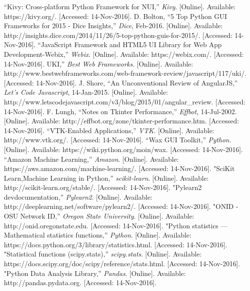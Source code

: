 \documentclass[journal,onecolumn]{IEEEtran}
\begin{document}
\begin{thebibliography}{1}

  “Kivy: Cross-platform Python Framework for NUI,” \emph{Kivy}. [Online]. Available: https://kivy.org/. [Accessed: 14-Nov-2016].
 D. Bolton, “5 Top Python GUI Frameworks for 2015 - Dice Insights,” \emph{Dice}, Feb-2016. [Online]. Available: http://insights.dice.com/2014/11/26/5-top-python-guis-for-2015/. [Accessed: 14-Nov-2016]. 
“JavaScript Framework and HTML5 UI Library for Web App Development-Webix,” \emph{Webix}. [Online]. Available: https://webix.com/. [Accessed: 14-Nov-2016]. 
 UKI,” \emph{Best Web Frameworks}. [Online]. Available: http://www.bestwebframeworks.com/web-framework-review/javascript/117/uki/. [Accessed: 14-Nov-2016]. 
J. Shore, “An Unconventional Review of AngularJS,” \emph{Let's Code Javascript}, 14-Jan-2015. [Online]. Available: http://www.letscodejavascript.com/v3/blog/2015/01/angular\_review. [Accessed: 14-Nov-2016]. 
 F. Lungh, “Notes on Tkinter Performance,” \emph{Effbot}, 14-Jul-2002. [Online]. Available: http://effbot.org/zone/tkinter-performance.htm. [Accessed: 14-Nov-2016]. 
 “VTK-Enabled Applications,” \emph{VTK}. [Online]. Available: http://www.vtk.org/. [Accessed: 14-Nov-2016]. 
 “Wax GUI Toolkit,” \emph{Python}. [Online]. Available: https://wiki.python.org/moin/wax. [Accessed: 14-Nov-2016]. 
 “Amazon Machine Learning,” \emph{Amazon}. [Online]. Available: https://aws.amazon.com/machine-learning/. [Accessed: 14-Nov-2016]. 
 "SciKit Learn,Machine Learning in Python,” \emph{scikit-learn}. [Online]. Available: http://scikit-learn.org/stable/. [Accessed: 14-Nov-2016]. 
 "Pylearn2 devdocumentation,” \emph{Pylearn2}. [Online]. Available: http://deeplearning.net/software/pylearn2/. [Accessed: 14-Nov-2016]. 
 "ONID - OSU Network ID,” \emph{Oregon State University}. [Online]. Available: http://onid.oregonstate.edu. [Accessed: 14-Nov-2016]. 
 "Python statistics — Mathematical statistics functions,” \emph{Python}. [Online]. Available: https://docs.python.org/3/library/statistics.html. [Accessed: 14-Nov-2016]. 
 "Statistical functions (scipy.stats),” \emph{scipy.stats}. [Online]. Available: https://docs.scipy.org/doc/scipy/reference/stats.html. [Accessed: 14-Nov-2016]. 
 "Python Data Analysis Library,” \emph{Pandas}. [Online]. Available: http://pandas.pydata.org. [Accessed: 14-Nov-2016]. 

\end{thebibliography}
\end{document}
